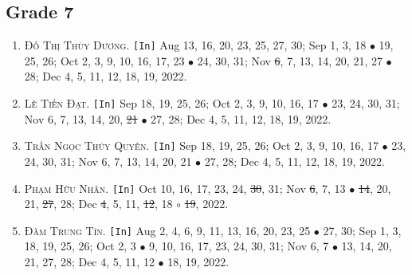 \documentclass{article}
\numberwithin{equation}{section}
\begin{document}
\subsection{Grade 7}
\begin{enumerate}
	\item \textsc{Đỗ Thị Thùy Dương.} \texttt{[In]} Aug 13, 16, 20, 23, 25, 27, 30; Sep 1, 3, 18 $\bullet$ 19, 25, 26; Oct 2, 3, 9, 10, 16, 17, 23 $\bullet$ 24, 30, 31; Nov \st{6}, 7, 13, 14, 20, 21, 27 $\bullet$ 28; Dec 4, 5, 11, 12, 18, 19, 2022.
	\item \textsc{Lê Tiến Đạt.} \texttt{[In]} Sep 18, 19, 25, 26; Oct 2, 3, 9, 10, 16, 17 $\bullet$ 23, 24, 30, 31; Nov 6, 7, 13, 14, 20, \st{21} $\bullet$ 27, 28; Dec 4, 5, 11, 12, 18, 19, 2022.
	\item \textsc{Trần Ngọc Thúy Quyên.} \texttt{[In]} Sep 18, 19, 25, 26; Oct 2, 3, 9, 10, 16, 17 $\bullet$ 23, 24, 30, 31; Nov 6, 7, 13, 14, 20, 21 $\bullet$ 27, 28; Dec 4, 5, 11, 12, 18, 19, 2022.
	\item \textsc{Phạm Hữu Nhân.} \texttt{[In]} Oct 10, 16, 17, 23, 24, \st{30}, 31; Nov \st{6}, 7, 13 $\bullet$ \st{14}, 20, 21, \st{27}, 28; Dec \st{4}, 5, 11, \st{12}, 18 $\circ$ \st{19}, 2022.
	\item \textsc{Đàm Trung Tín.} \texttt{[In]} Aug 2, 4, 6, 9, 11, 13, 16, 20, 23, 25 $\bullet$ 27, 30; Sep 1, 3, 18, 19, 25, 26; Oct 2, 3 $\bullet$ 9, 10, 16, 17, 23, 24, 30, 31; Nov 6, 7 $\bullet$ 13, 14, 20, 21, 27, 28; Dec 4, 5, 11, 12 $\bullet$ 18, 19, 2022.
\end{enumerate}
\end{document}
